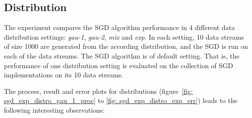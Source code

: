 \subsection{Distribution}
\label{subsec: sgd_exp_distro}
The experiment compares the SGD algorithm performance in 4 different data distribution settings: \textit{gau-1}, \textit{gau-2}, \textit{mix} and \textit{exp}. In each setting, 10 data streams of size 1000 are generated from the according distribution, and the SGD is run on each of the data streams. The SGD algorithm is of default setting. That is, the performance of one distribution setting is evaluated on the collection of SGD implementations on its 10 data streams.

The process, result and error plots for distributions (figure~\ref{fig: sgd_exp_distro_gau_1_proc} to \ref{fig: sgd_exp_distro_exp_err}) leads to the following interesting observations:
